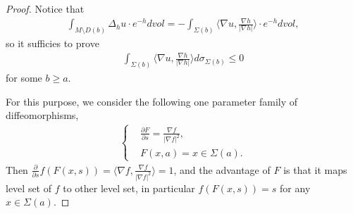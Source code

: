 \documentclass[12pt]{amsart}
\newcommand{\ba}{\begin{eqnarray}}
\newcommand{\ea}{\end{eqnarray}}
\newcommand{\ban}{\begin{eqnarray*}}
\newcommand{\ean}{\end{eqnarray*}}
\begin{document}
\begin{proof}
	Notice that
	\ban
	\int_{M\setminus D(b)} \Delta_h u\cdot e^{-h}dvol
	=-\int_{\Sigma(b)} \langle\nabla u, \frac{\nabla h}{|\nabla h|}\rangle \cdot e^{-h}dvol,
	\ean
	so it sufficies to prove
	\ba\label{equivalent the other direction}
	\int_{\Sigma(b)} \langle\nabla u, \frac{\nabla h}{|\nabla h|}\rangle d\sigma_{\Sigma(b)}\leq 0
	\ea
	for some $b\geq a$.
	
	\vspace{0.5cm}
	
	For this purpose, we consider the following one parameter family of diffeomorphisms,
	\begin{equation*}
		\begin{aligned}
			\begin{cases}
				&\frac{\partial F}{\partial s}=\frac{\nabla f}{|\nabla f|^2},\\
				&F(x, a)=x \in \Sigma(a).
			\end{cases}
		\end{aligned}
	\end{equation*}
	Then $\frac{\partial }{\partial s}f(F(x, s))=\langle\nabla f, \frac{\nabla f}{|\nabla f|^2} \rangle=1$,
	and the advantage of $F$ is that it maps level set of $f$ to other level set, in particular $f(F(x, s))=s$ for any $x\in \Sigma(a)$.
	

\end{proof}
\end{document}
